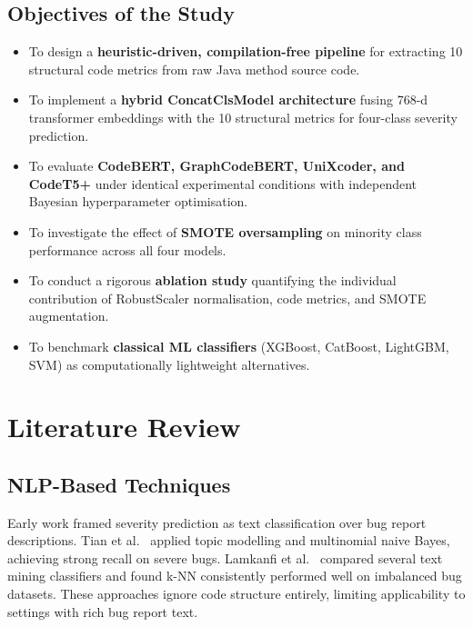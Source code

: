 \documentclass[12pt, a4paper]{report}
\begin{document}
\section{Objectives of the Study}
\begin{itemize}
  \item To design a \textbf{heuristic-driven, compilation-free pipeline} for extracting 10 structural code metrics from raw Java method source code.
  \item To implement a \textbf{hybrid ConcatClsModel architecture} fusing 768-d transformer embeddings with the 10 structural metrics for four-class severity prediction.
  \item To evaluate \textbf{CodeBERT, GraphCodeBERT, UniXcoder, and CodeT5+} under identical experimental conditions with independent Bayesian hyperparameter optimisation.
  \item To investigate the effect of \textbf{SMOTE oversampling} on minority class performance across all four models.
  \item To conduct a rigorous \textbf{ablation study} quantifying the individual contribution of RobustScaler normalisation, code metrics, and SMOTE augmentation.
  \item To benchmark \textbf{classical ML classifiers} (XGBoost, CatBoost, LightGBM, SVM) as computationally lightweight alternatives.
\end{itemize}

\clearpage
\chapter{Literature Review}

\section{NLP-Based Techniques}

Early work framed severity prediction as text classification over bug report descriptions. Tian et al.\ \cite{ref1} applied topic modelling and multinomial naive Bayes, achieving strong recall on severe bugs. Lamkanfi et al.\ \cite{ref3} compared several text mining classifiers and found k-NN consistently performed well on imbalanced bug datasets. These approaches ignore code structure entirely, limiting applicability to settings with rich bug report text.
\end{document}
